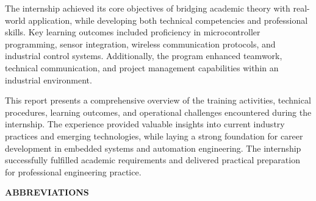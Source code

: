 \documentclass[12pt,a4paper]{report}
\begin{document}
\noindent The internship achieved its core objectives of bridging academic theory with real-world application, while developing both technical competencies and professional skills. Key learning outcomes included proficiency in microcontroller programming, sensor integration, wireless communication protocols, and industrial control systems. Additionally, the program enhanced teamwork, technical communication, and project management capabilities within an industrial environment.

\noindent This report presents a comprehensive overview of the training activities, technical procedures, learning outcomes, and operational challenges encountered during the internship. The experience provided valuable insights into current industry practices and emerging technologies, while laying a strong foundation for career development in embedded systems and automation engineering. The internship successfully fulfilled academic requirements and delivered practical preparation for professional engineering practice.

\newpage
\tableofcontents
\vspace{40pt}

\listoffigures
\vspace{-10pt}

\newpage

{\fontsize{14}{16.8}\selectfont\bfseries\centering ABBREVIATIONS\par}
\vspace{10pt}
\end{document}
